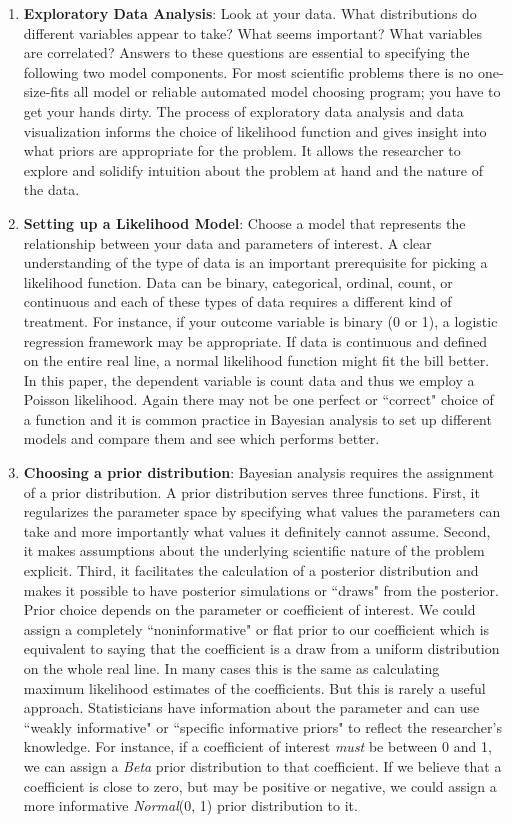 \documentclass[12pt, oneside]{article}
\begin{document}
 \begin{enumerate}
 \item{\textbf{Exploratory Data Analysis}: Look at your data.  What distributions do different variables appear to take?  What seems important?  What variables are correlated?  Answers to these questions are essential to specifying the following two model components.  For most scientific problems there is no one-size-fits all model or reliable automated model choosing program; you have to get your hands dirty. The process of exploratory data analysis and data visualization informs the choice of likelihood function and gives insight into what priors are appropriate for the problem. It allows the researcher to explore and solidify intuition about the problem at hand and the nature of the data.}
 \item{\textbf{Setting up a Likelihood Model}: Choose a model that represents the relationship between your data and parameters of interest.  A clear understanding of the type of data is an important prerequisite for picking a likelihood function. Data can be binary, categorical, ordinal, count, or continuous and each of these types of data requires a different kind of treatment. For instance, if your outcome variable is binary (0 or 1), a logistic regression framework may be appropriate. If data is continuous and defined on the entire real line, a normal likelihood function might fit the bill better. In this paper, the dependent variable is count data and thus we employ a Poisson likelihood. Again there may not be one perfect or ``correct" choice of a function and it is common practice in Bayesian analysis to set up different models and compare them and see which performs better.} 
 
 \item{\textbf{Choosing a prior distribution}:  
 Bayesian analysis requires the assignment of a prior distribution. A prior distribution serves three functions. First, it regularizes the parameter space by specifying what values the parameters can take and more importantly what values it definitely cannot assume. Second, it makes assumptions about the underlying scientific nature of the problem explicit. Third, it facilitates the calculation of a posterior distribution and makes it possible to have posterior simulations or ``draws" from the posterior. \\
 Prior choice depends on the parameter or coefficient of interest.  We could assign a completely ``noninformative" or flat prior to our coefficient which is equivalent to saying that the coefficient is a draw from a uniform distribution on the whole real line. In many cases this is the same as calculating maximum likelihood estimates of the coefficients. But this is rarely a useful approach. Statisticians have information about the parameter and can use ``weakly informative" or ``specific informative priors" to reflect the researcher's knowledge. For instance, if a coefficient of interest \emph{must} be between 0 and 1, we can assign a \emph{Beta} prior distribution to that coefficient.  If we believe that a coefficient is close to zero, but may be positive or negative, we could assign a more informative \emph{Normal}(0, 1) prior distribution to it. } \\
 

\end{enumerate}
\end{document}
